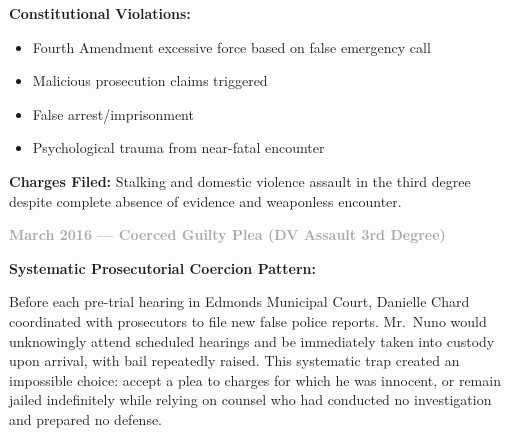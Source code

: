 \documentclass[11pt, letterpaper]{article}
\newcommand{\subsubsectiontitle}[1]{\vspace{0.1in}\noindent\textcolor{DarkGray}{\textbf{#1}}\vspace{0.05in}}
\begin{document}
\textbf{Constitutional Violations:}
\begin{itemize}[leftmargin=*,itemsep=2pt]
    \item Fourth Amendment excessive force based on false emergency call
    \item Malicious prosecution claims triggered
    \item False arrest/imprisonment
    \item Psychological trauma from near-fatal encounter
\end{itemize}

\textbf{Charges Filed:} Stalking and domestic violence assault in the third degree despite complete absence of evidence and weaponless encounter.

\subsubsectiontitle{March 2016 --- Coerced Guilty Plea (DV Assault 3rd Degree)}

\textbf{Systematic Prosecutorial Coercion Pattern:}

Before each pre-trial hearing in Edmonds Municipal Court, Danielle Chard coordinated with prosecutors to file new false police reports. Mr.\ Nuno would unknowingly attend scheduled hearings and be immediately taken into custody upon arrival, with bail repeatedly raised. This systematic trap created an impossible choice: accept a plea to charges for which he was innocent, or remain jailed indefinitely while relying on counsel who had conducted no investigation and prepared no defense.
\end{document}
